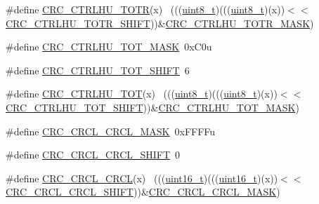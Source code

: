 \begin{DoxyCompactItemize}
\item 
\#define \hyperlink{group___c_r_c___register___masks_ga90b299bcced60b8b784350afac4da6dc}{C\+R\+C\+\_\+\+C\+T\+R\+L\+H\+U\+\_\+\+T\+O\+TR}(x)                                          ~(((\hyperlink{_p_e___types_8h_aba7bc1797add20fe3efdf37ced1182c5}{uint8\+\_\+t})(((\hyperlink{_p_e___types_8h_aba7bc1797add20fe3efdf37ced1182c5}{uint8\+\_\+t})(x))$<$$<$\hyperlink{group___c_r_c___register___masks_ga991fefda83335d188d0cc82f1e64f43e}{C\+R\+C\+\_\+\+C\+T\+R\+L\+H\+U\+\_\+\+T\+O\+T\+R\+\_\+\+S\+H\+I\+FT}))\&\hyperlink{group___c_r_c___register___masks_ga0418249380c6e69fc9a949f8da4e60f1}{C\+R\+C\+\_\+\+C\+T\+R\+L\+H\+U\+\_\+\+T\+O\+T\+R\+\_\+\+M\+A\+SK})
\item 
\#define \hyperlink{group___c_r_c___register___masks_gac2999b1c162cd0860f76f002ead704ad}{C\+R\+C\+\_\+\+C\+T\+R\+L\+H\+U\+\_\+\+T\+O\+T\+\_\+\+M\+A\+SK}~0x\+C0u
\item 
\#define \hyperlink{group___c_r_c___register___masks_ga079a05fc69d357e3fadfb07de8abbeee}{C\+R\+C\+\_\+\+C\+T\+R\+L\+H\+U\+\_\+\+T\+O\+T\+\_\+\+S\+H\+I\+FT}~6
\item 
\#define \hyperlink{group___c_r_c___register___masks_ga7ac4af4df4f785bf6205fd8e6118f28b}{C\+R\+C\+\_\+\+C\+T\+R\+L\+H\+U\+\_\+\+T\+OT}(x)                                            ~(((\hyperlink{_p_e___types_8h_aba7bc1797add20fe3efdf37ced1182c5}{uint8\+\_\+t})(((\hyperlink{_p_e___types_8h_aba7bc1797add20fe3efdf37ced1182c5}{uint8\+\_\+t})(x))$<$$<$\hyperlink{group___c_r_c___register___masks_ga079a05fc69d357e3fadfb07de8abbeee}{C\+R\+C\+\_\+\+C\+T\+R\+L\+H\+U\+\_\+\+T\+O\+T\+\_\+\+S\+H\+I\+FT}))\&\hyperlink{group___c_r_c___register___masks_gac2999b1c162cd0860f76f002ead704ad}{C\+R\+C\+\_\+\+C\+T\+R\+L\+H\+U\+\_\+\+T\+O\+T\+\_\+\+M\+A\+SK})
\item 
\#define \hyperlink{group___c_r_c___register___masks_ga41565ef941db78c9470646b7246e78a1}{C\+R\+C\+\_\+\+C\+R\+C\+L\+\_\+\+C\+R\+C\+L\+\_\+\+M\+A\+SK}~0x\+F\+F\+F\+Fu
\item 
\#define \hyperlink{group___c_r_c___register___masks_ga0b4ef9a44a372a3fc83d3a414a4a976b}{C\+R\+C\+\_\+\+C\+R\+C\+L\+\_\+\+C\+R\+C\+L\+\_\+\+S\+H\+I\+FT}~0
\item 
\#define \hyperlink{group___c_r_c___register___masks_gaddadfc7b1b0cc564ed86759d201f8a5d}{C\+R\+C\+\_\+\+C\+R\+C\+L\+\_\+\+C\+R\+CL}(x)                                              ~(((\hyperlink{_p_e___types_8h_a1f1825b69244eb3ad2c7165ddc99c956}{uint16\+\_\+t})(((\hyperlink{_p_e___types_8h_a1f1825b69244eb3ad2c7165ddc99c956}{uint16\+\_\+t})(x))$<$$<$\hyperlink{group___c_r_c___register___masks_ga0b4ef9a44a372a3fc83d3a414a4a976b}{C\+R\+C\+\_\+\+C\+R\+C\+L\+\_\+\+C\+R\+C\+L\+\_\+\+S\+H\+I\+FT}))\&\hyperlink{group___c_r_c___register___masks_ga41565ef941db78c9470646b7246e78a1}{C\+R\+C\+\_\+\+C\+R\+C\+L\+\_\+\+C\+R\+C\+L\+\_\+\+M\+A\+SK})
$$
\end{DoxyCompactItemize}
